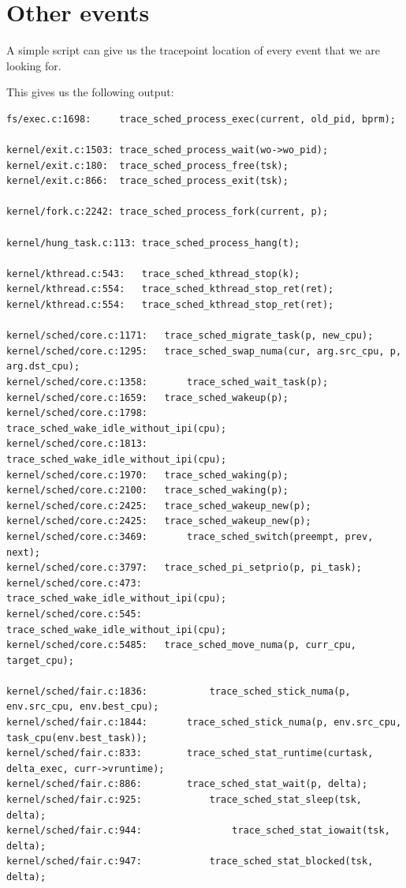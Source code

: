 \documentclass[10pt]{book}
\begin{document}
\section{Other events} %
\label{sec:other_events}
A simple script can give us the tracepoint location of every event that we are looking for.
This gives us the following output:
\begin{verbatim}
fs/exec.c:1698:		trace_sched_process_exec(current, old_pid, bprm);

kernel/exit.c:1503:	trace_sched_process_wait(wo->wo_pid);
kernel/exit.c:180:	trace_sched_process_free(tsk);
kernel/exit.c:866:	trace_sched_process_exit(tsk);

kernel/fork.c:2242:	trace_sched_process_fork(current, p);

kernel/hung_task.c:113:	trace_sched_process_hang(t);

kernel/kthread.c:543:	trace_sched_kthread_stop(k);
kernel/kthread.c:554:	trace_sched_kthread_stop_ret(ret);
kernel/kthread.c:554:	trace_sched_kthread_stop_ret(ret);

kernel/sched/core.c:1171:	trace_sched_migrate_task(p, new_cpu);
kernel/sched/core.c:1295:	trace_sched_swap_numa(cur, arg.src_cpu, p, arg.dst_cpu);
kernel/sched/core.c:1358:		trace_sched_wait_task(p);
kernel/sched/core.c:1659:	trace_sched_wakeup(p);
kernel/sched/core.c:1798:			trace_sched_wake_idle_without_ipi(cpu);
kernel/sched/core.c:1813:		trace_sched_wake_idle_without_ipi(cpu);
kernel/sched/core.c:1970:	trace_sched_waking(p);
kernel/sched/core.c:2100:	trace_sched_waking(p);
kernel/sched/core.c:2425:	trace_sched_wakeup_new(p);
kernel/sched/core.c:2425:	trace_sched_wakeup_new(p);
kernel/sched/core.c:3469:		trace_sched_switch(preempt, prev, next);
kernel/sched/core.c:3797:	trace_sched_pi_setprio(p, pi_task);
kernel/sched/core.c:473:		trace_sched_wake_idle_without_ipi(cpu);
kernel/sched/core.c:545:		trace_sched_wake_idle_without_ipi(cpu);
kernel/sched/core.c:5485:	trace_sched_move_numa(p, curr_cpu, target_cpu);

kernel/sched/fair.c:1836:			trace_sched_stick_numa(p, env.src_cpu, env.best_cpu);
kernel/sched/fair.c:1844:		trace_sched_stick_numa(p, env.src_cpu, task_cpu(env.best_task));
kernel/sched/fair.c:833:		trace_sched_stat_runtime(curtask, delta_exec, curr->vruntime);
kernel/sched/fair.c:886:		trace_sched_stat_wait(p, delta);
kernel/sched/fair.c:925:			trace_sched_stat_sleep(tsk, delta);
kernel/sched/fair.c:944:				trace_sched_stat_iowait(tsk, delta);
kernel/sched/fair.c:947:			trace_sched_stat_blocked(tsk, delta);


\end{verbatim}
\end{document}
